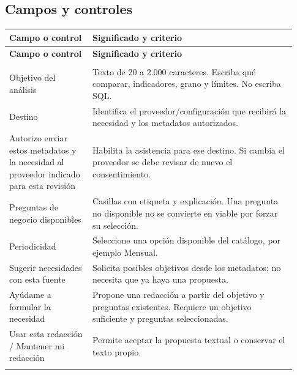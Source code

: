\subsection{Campos y controles}
\begingroup
\fontsize{10}{12.5}\selectfont
\setlength{\tabcolsep}{5pt}
\renewcommand{\arraystretch}{1.15}
\begin{longtable}{@{}>{\RaggedRight\arraybackslash}p{0.27\linewidth}>{\RaggedRight\arraybackslash}p{0.66\linewidth}@{}}
\toprule
\textbf{Campo o control} & \textbf{Significado y criterio} \\
\midrule
\endfirsthead
\toprule
\textbf{Campo o control} & \textbf{Significado y criterio} \\
\midrule
\endhead
\midrule
\multicolumn{2}{r}{\footnotesize Continúa en la página siguiente}\\
\endfoot
\bottomrule
\endlastfoot
Objetivo del análisis & Texto de 20 a 2.000 caracteres. Escriba qué comparar, indicadores, grano y límites. No escriba SQL. \\
\addlinespace[3pt]
Destino & Identifica el proveedor/configuración que recibirá la necesidad y los metadatos autorizados. \\
\addlinespace[3pt]
Autorizo enviar estos metadatos y la necesidad al proveedor indicado para esta revisión & Habilita la asistencia para ese destino. Si cambia el proveedor se debe revisar de nuevo el consentimiento. \\
\addlinespace[3pt]
Preguntas de negocio disponibles & Casillas con etiqueta y explicación. Una pregunta no disponible no se convierte en viable por forzar su selección. \\
\addlinespace[3pt]
Periodicidad & Seleccione una opción disponible del catálogo, por ejemplo Mensual. \\
\addlinespace[3pt]
Sugerir necesidades con esta fuente & Solicita posibles objetivos desde los metadatos; no necesita que ya haya una propuesta. \\
\addlinespace[3pt]
Ayúdame a formular la necesidad & Propone una redacción a partir del objetivo y preguntas existentes. Requiere un objetivo suficiente y preguntas seleccionadas. \\
\addlinespace[3pt]
Usar esta redacción / Mantener mi redacción & Permite aceptar la propuesta textual o conservar el texto propio. \\
\addlinespace[3pt]
\end{longtable}
\endgroup

